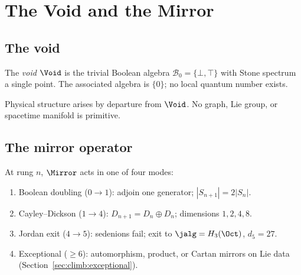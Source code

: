 \section{The Void and the Mirror}
\label{sec:mirror}

\subsection{The void}
\label{sec:mirror:void}

\begin{definition}[Void]\label{def:void}
The \emph{void} $\Void$ is the trivial Boolean algebra
$\mathcal{B}_0=\{\bot,\top\}$ with Stone spectrum a single point. The
associated algebra is $\{0\}$; no local quantum number exists.
\end{definition}

\begin{axiom}[Void]\label{ax:void}
Physical structure arises by departure from $\Void$. No graph, Lie group, or
spacetime manifold is primitive.
\end{axiom}

\subsection{The mirror operator}
\label{sec:mirror:operator}

\begin{definition}\label{def:mirror:modes}
At rung $n$, $\Mirror$ acts in one of four modes:
\begin{enumerate}[label=\textbf{M\arabic*.},leftmargin=*]
  \item Boolean doubling ($0\to1$): adjoin one generator; $|S_{n+1}|=2|S_n|$.
  \item Cayley--Dickson ($1\to4$): $D_{n+1}=D_n\oplus D_n$; dimensions
    $1,2,4,8$.
  \item Jordan exit ($4\to5$): sedenions fail; exit to $\jalg=H_3(\Oct)$,
    $d_5=27$.
  \item Exceptional ($\geq6$): automorphism, product, or Cartan mirrors on
    Lie data (Section~\ref{sec:climb:exceptional}).
\end{enumerate}
\end{definition}

